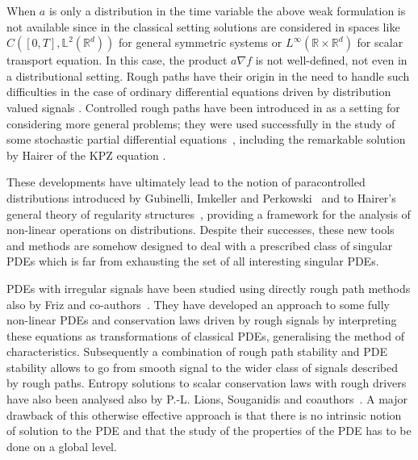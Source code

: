\documentclass[11pt,a4paper]{amsart}
\newcommand{\RR}{\mathbb{R}}  \newcommand{\CC}{\mathbb{C}}  \newcommand{\LL}{\mathbb{L}}  \newcommand{\WW}{\mathbb{W}}
\theoremstyle{plain}%
\theoremstyle{definition}
\theoremstyle{remark}
\numberwithin{equation}{section} %
\begin{document}
When $a$ is only a distribution in the time variable the above weak formulation is not available since in the classical setting solutions are considered in spaces like $C([0,T],\LL^2(\RR^d))$ for general symmetric systems  or $L^\infty(\RR\times \RR^d)$ for scalar transport equation. In this case, the product $a\nabla f$ is not well-defined, not even in a distributional setting. Rough paths have their origin in the need to handle such difficulties in the case of ordinary differential equations driven by distribution valued signals \cite{Lyons98,Lyons2002,Lyons2007,Friz2010}. Controlled rough paths have been introduced in \cite{Gubinelli04} as a setting for considering more general problems; they were used successfully in the study of some stochastic partial differential equations~\cite{Bessaih2005,GT,Deya2012,Hairer2011,Gubinelli2012a,Hairer2012,Hairer2013},  including the remarkable solution by Hairer of the KPZ equation \cite{HairerKPZ}. 

\smallskip

These developments have ultimately lead to the notion of paracontrolled distributions introduced by Gubinelli, Imkeller and Perkowski~\cite{GIP} and to Hairer's general theory of regularity structures~\cite{HairerRegularity},  providing a  framework for the analysis of non-linear operations on distributions. Despite their successes, these new tools and methods are somehow designed to deal with a prescribed class of singular PDEs which is far from exhausting the set of all interesting singular PDEs. 

\smallskip

PDEs with irregular signals have been studied using directly rough path methods also by Friz and co-authors~\cite{Caruana2009, CaruanaFrizOberhauser, FrizOberhauser1, FrizOberhauser2, FrizGess}. They have developed an approach to some  fully non-linear PDEs and conservation laws driven by rough signals by interpreting these equations  as transformations of classical PDEs, generalising the method of characteristics. Subsequently a combination of rough path stability and PDE stability allows to go from smooth signal to the wider class of signals described by rough paths. Entropy solutions to scalar conservation laws with rough drivers have also been analysed also by P.-L. Lions, Souganidis and coauthors~\cite{LionsPerthameSouganidis1,LionsPerthameSouganidis2, GessSouganidis}. A major drawback of this otherwise effective approach is that there is no intrinsic notion of solution to the PDE and that the study of the properties of the PDE has to be done on a global level.
\end{document}
